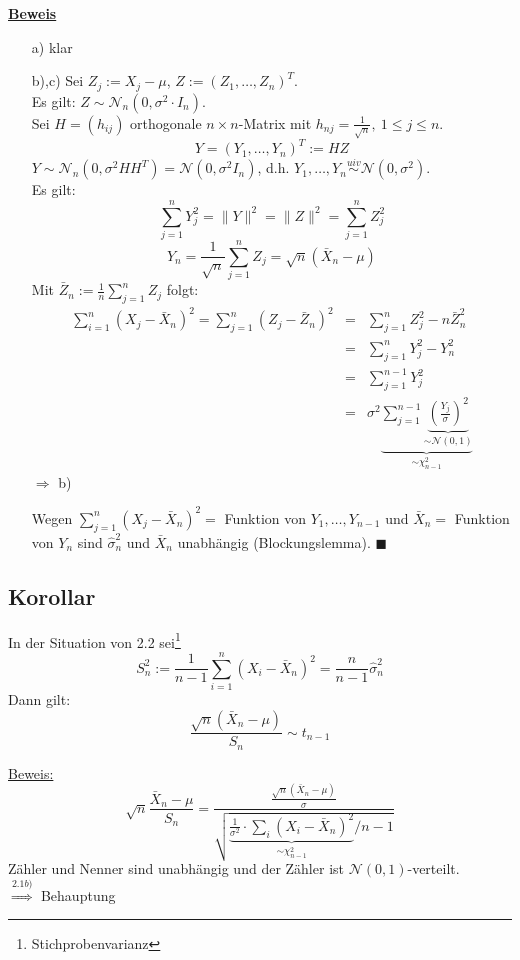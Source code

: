 \documentclass[a4paper,11pt,twoside,titlepage]{article}
\newcommand\NN{ \mathcal{N} } %
\newcommand{\uiv}{\ensuremath{\stackrel{uiv}{\sim}}}
\begin{document}
\underline{\textbf{Beweis}}
\begin{itemize}
\item[a) ]klar
\item[b),c) ]Sei $Z_j:=X_j-\mu$, $Z:=(Z_1,\ldots,Z_n)^T$.\\
Es gilt: $Z\sim \NN_n(0,\sigma^2\cdot I_n)$.\\
Sei $H=(h_{ij})$ orthogonale $n \times n$-Matrix mit $h_{nj}=\frac{1}{\sqrt n},\ 1\leq j\leq n$.
\[Y=(Y_1,\ldots,Y_n)^T:=HZ\]
$Y\sim\NN_n(0,\sigma^2 HH^T)=\NN(0,\sigma^2 I_n)$, d.h. $Y_1,\ldots,Y_n\uiv\NN(0,\sigma^2)$.\\
Es gilt:
\[\sum_{j=1}^n Y_j^2=\|Y\|^2=\|Z\|^2=\sum_{j=1}^nZ_j^2\]
\[Y_n=\frac{1}{\sqrt n}\sum_{j=1}^nZ_j=\sqrt n(\bar{X}_n-\mu)\]
Mit $\bar Z_n:=\frac1n\sum_{j=1}^nZ_j$ folgt:
\begin{eqnarray*}\sum_{i=1}^n(X_j-\bar X_n)^2=\sum_{j=1}^n(Z_j-\bar Z_n)^2&=&\sum_{j=1}^n Z_j^2-n\bar Z_n^2\\&=&\sum_{j=1}^nY_j^2-Y_n^2\\&=&\sum_{j=1}^{n-1}Y_j^2\\&=&\sigma^2\underbrace{\sum_{j=1}^{n-1}\underbrace{\left(\frac{Y_j}{\sigma}\right)^2}_{\sim\NN(0,1)}}_{\sim\chi^2_{n-1}}\end{eqnarray*}
$\Rightarrow$ b)

Wegen $\sum_{j=1}^n(X_j-\bar X_n)^2=$ Funktion von $Y_1,\ldots,Y_{n-1}$ und $\bar X_n=$ Funktion von $Y_n$ sind $\hat\sigma_n^2$ und $\bar X_n$ unabhängig (Blockungslemma). $\blacksquare$\end{itemize}

\subsection{Korollar}
In der Situation von 2.2 sei\footnote{Stichprobenvarianz} 
\[S_n^2:=\frac{1}{n-1}\sum_{i=1}^n(X_i-\bar X_n)^2=\frac{n}{n-1}\hat\sigma_n^2\]
Dann gilt:
\[\frac{\sqrt n(\bar X_n-\mu)}{S_n}\sim t_{n-1}\]

\underline{Beweis:}
\[\sqrt n\frac{\bar X_n-\mu}{S_n}=\frac{\frac{\sqrt n(\bar X_n-\mu)}{\sigma}}{\sqrt{\underbrace{\frac{1}{\sigma^2}\cdot\sum_i(X_i-\bar X_n)^2}_{\sim\chi_{n-1}^2}/n-1}}\]
Zähler und Nenner sind unabhängig und der Zähler ist $\NN(0,1)$-verteilt.\\
$\stackrel{2.1b)}{\Rightarrow}$ Behauptung
\end{document}
